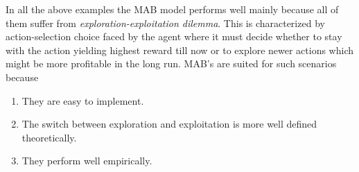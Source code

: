 In all the above examples the MAB model performs well mainly because all of them suffer from \textit{exploration-exploitation dilemma}. This is characterized by action-selection choice faced by the agent where it must decide whether to stay with the action yielding highest reward till now or to explore newer actions which might be more profitable in the long run. MAB's are suited for such scenarios because 
\begin{enumerate}
\item They are easy to implement.
\item The switch between exploration and exploitation is more well defined theoretically.
\item They perform well empirically.
\end{enumerate}

